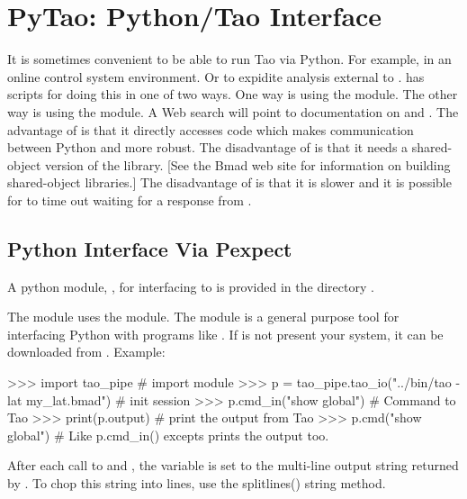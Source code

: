 \chapter{PyTao: Python/Tao Interface}
\label{c:python}

It is sometimes convenient to be able to run Tao via Python. For example, in an online control
system environment. Or to expidite analysis external to \tao. \tao has scripts for doing this in
one of two ways. One way is using the  module. The other way is using the 
module. A Web search will point to documentation on  and . The advantage of
 is that it directly accesses \tao code which makes communication between Python and \tao
more robust. The disadvantage of  is that it needs a shared-object version of the
 library. [See the Bmad web site for information on building shared-object libraries.] The
disadvantage of  is that it is slower and it is possible for  to time out
waiting for a response from \tao.



\section{Python Interface Via Pexpect}

A python module, , for interfacing \tao to  is provided in the directory
.

The  module uses the  module. The  module is a general purpose
tool for interfacing Python with programs like \tao. If  is not present your system, it
can be downloaded from . Example:
\begin{example}
  >>> import tao_pipe                                       # import module
  >>> p = tao_pipe.tao_io("../bin/tao -lat my_lat.bmad")    # init session
  >>> p.cmd_in("show global")               # Command to Tao
  >>> print(p.output)                       # print the output from Tao
  >>> p.cmd("show global")                  # Like p.cmd_in() excepts prints the output too.
\end{example}

After each call to  and , the  variable is set to
the multi-line output string returned by \tao. To chop this string into lines, use the splitlines()
string method.

